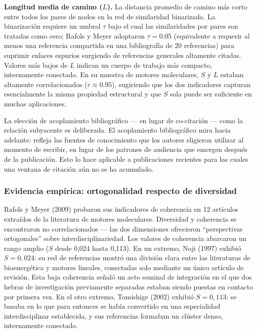 \documentclass[
]{article}
\begin{document}
\textbf{Longitud media de camino (\(L\)).} La distancia promedio de
camino más corto entre todos los pares de nodos en la red de similaridad
binarizada. La binarización requiere un umbral \(\tau\) bajo el cual las
similaridades por pares son tratadas como cero; Rafols y Meyer adoptaron
\(\tau = 0.05\) (equivalente a requerir al menos una referencia
compartida en una bibliografía de 20 referencias) para suprimir enlaces
espurios surgiendo de referencias generales altamente citadas. Valores
más bajos de \(L\) indican un cuerpo de trabajo más compacto,
internamente conectado. En su muestra de motores moleculares, \(S\) y
\(L\) estaban altamente correlacionados (\(r \approx 0.95\)), sugiriendo
que los dos indicadores capturan esencialmente la misma propiedad
estructural y que \(S\) sola puede ser suficiente en muchas
aplicaciones.

La elección de acoplamiento bibliográfico --- en lugar de co-citación
--- como la relación subyacente es deliberada. El acoplamiento
bibliográfico mira hacia adelante: refleja las fuentes de conocimiento
que los autores eligieron utilizar al momento de escribir, en lugar de
los patrones de audiencia que emergen después de la publicación. Esto lo
hace aplicable a publicaciones recientes para las cuales una ventana de
citación aún no se ha acumulado.

\hypertarget{evidencia-empuxedrica-ortogonalidad-respecto-de-diversidad}{%
\subsubsection{Evidencia empírica: ortogonalidad respecto de
diversidad}\label{evidencia-empuxedrica-ortogonalidad-respecto-de-diversidad}}

Rafols y Meyer (2009) probaron sus indicadores de coherencia en 12
artículos extraídos de la literatura de motores moleculares. Diversidad
y coherencia se encontraron no correlacionados --- las dos dimensiones
ofrecieron ``perspectivas ortogonales'' sobre interdisciplinariedad. Los
valores de coherencia abarcaron un rango amplio (\(S\) desde 0,024 hasta
0,113). En un extremo, Noji (1997) exhibió \(S = 0,024\): su red de
referencias mostró una división clara entre las literaturas de
bioenergética y motores lineales, conectadas solo mediante un único
artículo de revisión. Esta baja coherencia señaló un acto seminal de
integración en el que dos hebras de investigación previamente separadas
estaban siendo puestas en contacto por primera vez. En el otro extremo,
Tomishige (2002) exhibió \(S = 0,113\): se basaba en lo que para
entonces se había convertido en una especialidad interdisciplinar
establecida, y sus referencias formaban un clúster denso, internamente
conectado.
\end{document}
